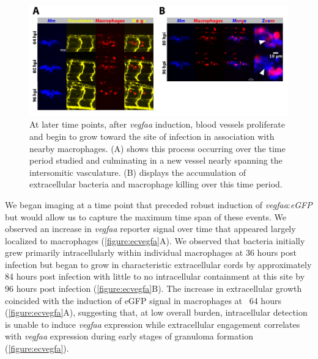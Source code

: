 \begin{figure}
\centering
\includegraphics[width=\textwidth]{images/extracellularflk1.pdf}
\caption{At later time points, after \textit{vegfaa} induction, blood vessels proliferate and begin to grow toward the site of infection in association with nearby macrophages. (A) shows this process occurring over the time period studied and culminating in a new vessel nearly spanning the intersomitic vasculature. (B) displays the accumulation of extracellular bacteria and macrophage killing over this time period.}
\label{figure:ecflk1}

\end{figure}

We began imaging at a time point that preceded robust induction of \textit{vegfaa}:\textit{eGFP} but would allow us to capture the maximum time span of these events. We observed an increase in \textit{vegfaa} reporter signal over time that appeared largely localized to macrophages (\autoref{figure:ecvegfa}A). We observed that bacteria initially grew primarily intracellularly within individual macrophages at 36 hours post infection but began to grow in characteristic extracellular cords by approximately 84 hours post infection with little to no intracellular containment at this site by 96 hours post infection (\autoref{figure:ecvegfa}B). The increase in extracellular growth coincided with the induction of eGFP signal in macrophages at ~64 hours (\autoref{figure:ecvegfa}A), suggesting that, at low overall burden, intracellular detection is unable to induce \textit{vegfaa} expression while extracellular engagement correlates with \textit{vegfaa} expression during early stages of granuloma formation (\autoref{figure:ecvegfa}). 

